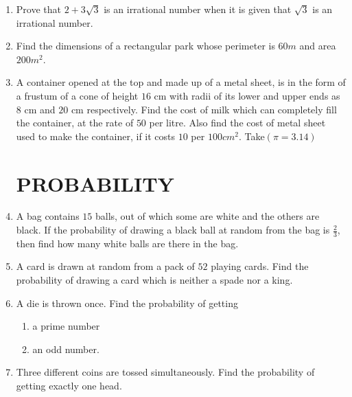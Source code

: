 \documentclass[2pt,-letter paper]{article}
\providecommand{\brak}[1]{\ensuremath{\left(#1\right)}}
\begin{document}
\begin{enumerate}
\item Prove that $2 + 3\sqrt{3}$ is an irrational number when it is given that $\sqrt{3}$ is an irrational number.
\item Find the dimensions of a rectangular park whose perimeter is $60 m$ and area $200 m^2$.
\item A container opened at the top and made up of a metal sheet, is in the form of a frustum of a cone of height $16$ cm with radii of its lower and upper ends as $8$ cm and $20$ cm respectively. Find the cost of milk which can completely fill the container, at the rate of \rupee $50$ per litre. Also find the cost of metal sheet used to make the container, if it costs \rupee$ 10$ per $100 cm^2$. Take$\brak{\pi = 3.14}$

\section{PROBABILITY}
\item A bag contains $15$ balls, out of which some are white and the others are black. If the probability of drawing a black ball at random from the bag is $\frac{2}{3}$, then find how many white balls are there in the bag.

\item A card is drawn at random from a pack of $52$ playing cards. Find the probability of drawing a card which is neither a spade nor a king.

\item A die is thrown once. Find the probability of getting
\begin{enumerate}
    \item a prime number
    \item an odd number. 
\end{enumerate}
\item Three different coins are tossed simultaneously. Find the probability of getting exactly one head.
\end{enumerate}
\end{document}
